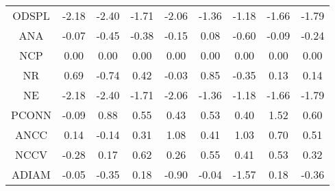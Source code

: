 \begin{longtable}{ | c || c | c | c | c | c | c | c || c |}
ODSPL &  \cellcolor[HTML]{FFC7C7} -2.18 &  \cellcolor[HTML]{FFBFBF} -2.40 &  \cellcolor[HTML]{FFD7D7} -1.71 &  \cellcolor[HTML]{FFCFCF} -2.06 &  \cellcolor[HTML]{FFDFDF} -1.36 &  \cellcolor[HTML]{FFDFDF} -1.18 &  \cellcolor[HTML]{FFD7D7} -1.66 &  \cellcolor[HTML]{FFCFCF} -1.79 \\
ANA &  \cellcolor[HTML]{FFFFFF} -0.07 &  \cellcolor[HTML]{FFF7F7} -0.45 &  \cellcolor[HTML]{FFF7F7} -0.38 &  \cellcolor[HTML]{FFFFFF} -0.15 &  \cellcolor[HTML]{FFFFFF} 0.08 &  \cellcolor[HTML]{FFEFEF} -0.60 &  \cellcolor[HTML]{FFFFFF} -0.09 &  \cellcolor[HTML]{FFF7F7} -0.24 \\
NCP &  \cellcolor[HTML]{FFFFFF} 0.00 &  \cellcolor[HTML]{FFFFFF} 0.00 &  \cellcolor[HTML]{FFFFFF} 0.00 &  \cellcolor[HTML]{FFFFFF} 0.00 &  \cellcolor[HTML]{FFFFFF} 0.00 &  \cellcolor[HTML]{FFFFFF} 0.00 &  \cellcolor[HTML]{FFFFFF} 0.00 &  \cellcolor[HTML]{FFFFFF} 0.00 \\
NR &  \cellcolor[HTML]{EFEFFF} 0.69 &  \cellcolor[HTML]{FFEFEF} -0.74 &  \cellcolor[HTML]{F7F7FF} 0.42 &  \cellcolor[HTML]{FFFFFF} -0.03 &  \cellcolor[HTML]{E7E7FF} 0.85 &  \cellcolor[HTML]{FFF7F7} -0.35 &  \cellcolor[HTML]{FFFFFF} 0.13 &  \cellcolor[HTML]{FFFFFF} 0.14 \\
NE &  \cellcolor[HTML]{FFC7C7} -2.18 &  \cellcolor[HTML]{FFBFBF} -2.40 &  \cellcolor[HTML]{FFD7D7} -1.71 &  \cellcolor[HTML]{FFCFCF} -2.06 &  \cellcolor[HTML]{FFDFDF} -1.36 &  \cellcolor[HTML]{FFDFDF} -1.18 &  \cellcolor[HTML]{FFD7D7} -1.66 &  \cellcolor[HTML]{FFCFCF} -1.79 \\
PCONN &  \cellcolor[HTML]{FFFFFF} -0.09 &  \cellcolor[HTML]{E7E7FF} 0.88 &  \cellcolor[HTML]{EFEFFF} 0.55 &  \cellcolor[HTML]{F7F7FF} 0.43 &  \cellcolor[HTML]{EFEFFF} 0.53 &  \cellcolor[HTML]{F7F7FF} 0.40 &  \cellcolor[HTML]{D7D7FF} 1.52 &  \cellcolor[HTML]{EFEFFF} 0.60 \\
ANCC &  \cellcolor[HTML]{FFFFFF} 0.14 &  \cellcolor[HTML]{FFFFFF} -0.14 &  \cellcolor[HTML]{F7F7FF} 0.31 &  \cellcolor[HTML]{E7E7FF} 1.08 &  \cellcolor[HTML]{F7F7FF} 0.41 &  \cellcolor[HTML]{E7E7FF} 1.03 &  \cellcolor[HTML]{EFEFFF} 0.70 &  \cellcolor[HTML]{EFEFFF} 0.51 \\
NCCV &  \cellcolor[HTML]{FFF7F7} -0.28 &  \cellcolor[HTML]{F7F7FF} 0.17 &  \cellcolor[HTML]{EFEFFF} 0.62 &  \cellcolor[HTML]{F7F7FF} 0.26 &  \cellcolor[HTML]{EFEFFF} 0.55 &  \cellcolor[HTML]{F7F7FF} 0.41 &  \cellcolor[HTML]{EFEFFF} 0.53 &  \cellcolor[HTML]{F7F7FF} 0.32 \\
ADIAM &  \cellcolor[HTML]{FFFFFF} -0.05 &  \cellcolor[HTML]{FFF7F7} -0.35 &  \cellcolor[HTML]{F7F7FF} 0.18 &  \cellcolor[HTML]{FFE7E7} -0.90 &  \cellcolor[HTML]{FFFFFF} -0.04 &  \cellcolor[HTML]{FFD7D7} -1.57 &  \cellcolor[HTML]{F7F7FF} 0.18 &  \cellcolor[HTML]{FFF7F7} -0.36 \\

\end{longtable}

